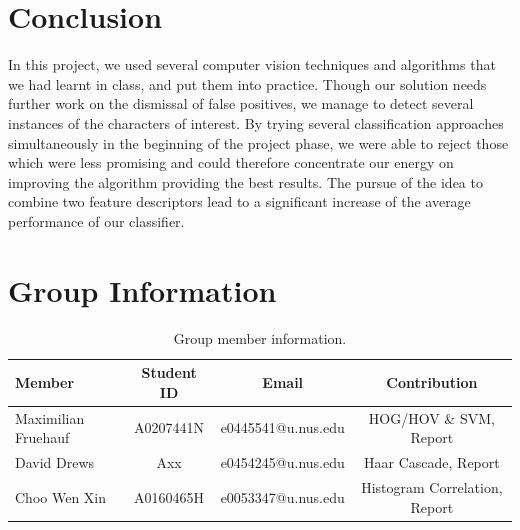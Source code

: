 \documentclass[11pt]{article}
\begin{document}
\section{Conclusion}
In this project, we used several computer vision techniques and algorithms that we had
learnt in class, and put them into practice. Though our solution needs further work on the dismissal of
false positives, we manage to detect several instances of the characters of interest. By trying several
classification approaches simultaneously in the beginning of the project phase, we were able to reject those
which were less promising and could therefore concentrate our energy on improving the algorithm providing
the best results. The pursue of the idea to combine two feature descriptors lead to a significant increase
of the average performance of our classifier.

\section{Group Information}

\begin{table}[ht]
    \centering
    \begin{tabular}{lccc}
    \toprule
     Member & Student ID & Email & Contribution\\
    \midrule
    Maximilian Fruehauf& A0207441N & e0445541@u.nus.edu & HOG/HOV \& SVM, Report \\
    David Drews& Axx &e0454245@u.nus.edu & Haar Cascade, Report \\
    Choo Wen Xin& A0160465H & e0053347@u.nus.edu & Histogram Correlation, Report \\
    \bottomrule
    \end{tabular}
    \caption{Group member information.}
    \label{tab:dataset}
\end{table}

\pagebreak




 
\end{document}
